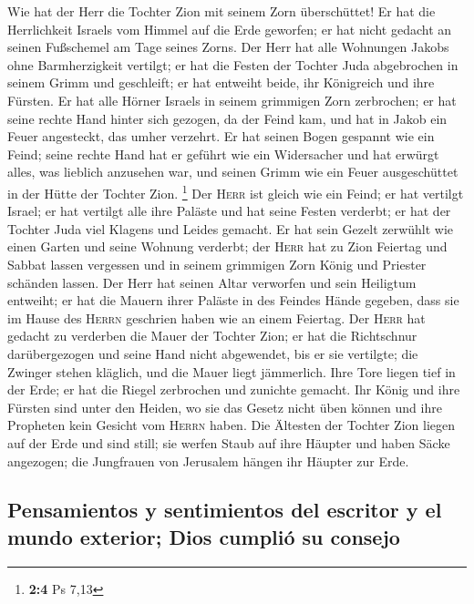  Wie hat der Herr die Tochter Zion mit seinem Zorn
überschüttet! Er hat die Herrlichkeit Israels vom Himmel auf die Erde
geworfen; er hat nicht gedacht an seinen Fußschemel am Tage seines
Zorns.  Der Herr hat alle Wohnungen Jakobs ohne
Barmherzigkeit vertilgt; er hat die Festen der Tochter Juda abgebrochen
in seinem Grimm und geschleift; er hat entweiht beide, ihr Königreich
und ihre Fürsten.  Er hat alle Hörner Israels in seinem
grimmigen Zorn zerbrochen; er hat seine rechte Hand hinter sich gezogen,
da der Feind kam, und hat in Jakob ein Feuer angesteckt, das umher
verzehrt.  Er hat seinen Bogen gespannt wie ein Feind;
seine rechte Hand hat er geführt wie ein Widersacher und hat erwürgt
alles, was lieblich anzusehen war, und seinen Grimm wie ein Feuer
ausgeschüttet in der Hütte der Tochter Zion. \footnote{\textbf{2:4} Ps
  7,13}  Der \textsc{Herr} ist gleich wie ein Feind; er
hat vertilgt Israel; er hat vertilgt alle ihre Paläste und hat seine
Festen verderbt; er hat der Tochter Juda viel Klagens und Leides
gemacht.  Er hat sein Gezelt zerwühlt wie einen Garten und
seine Wohnung verderbt; der \textsc{Herr} hat zu Zion Feiertag und
Sabbat lassen vergessen und in seinem grimmigen Zorn König und Priester
schänden lassen.  Der Herr hat seinen Altar verworfen und
sein Heiligtum entweiht; er hat die Mauern ihrer Paläste in des Feindes
Hände gegeben, dass sie im Hause des \textsc{Herrn} geschrien haben wie
an einem Feiertag.  Der \textsc{Herr} hat gedacht zu
verderben die Mauer der Tochter Zion; er hat die Richtschnur
darübergezogen und seine Hand nicht abgewendet, bis er sie vertilgte;
die Zwinger stehen kläglich, und die Mauer liegt jämmerlich.
 Ihre Tore liegen tief in der Erde; er hat die Riegel
zerbrochen und zunichte gemacht. Ihr König und ihre Fürsten sind unter
den Heiden, wo sie das Gesetz nicht üben können und ihre Propheten kein
Gesicht vom \textsc{Herrn} haben.  Die Ältesten der
Tochter Zion liegen auf der Erde und sind still; sie werfen Staub auf
ihre Häupter und haben Säcke angezogen; die Jungfrauen von Jerusalem
hängen ihr Häupter zur Erde.

\hypertarget{pensamientos-y-sentimientos-del-escritor-y-el-mundo-exterior-dios-cumpliuxf3-su-consejo}{%
\subsection{Pensamientos y sentimientos del escritor y el mundo
exterior; Dios cumplió su
consejo}\label{pensamientos-y-sentimientos-del-escritor-y-el-mundo-exterior-dios-cumpliuxf3-su-consejo}}

